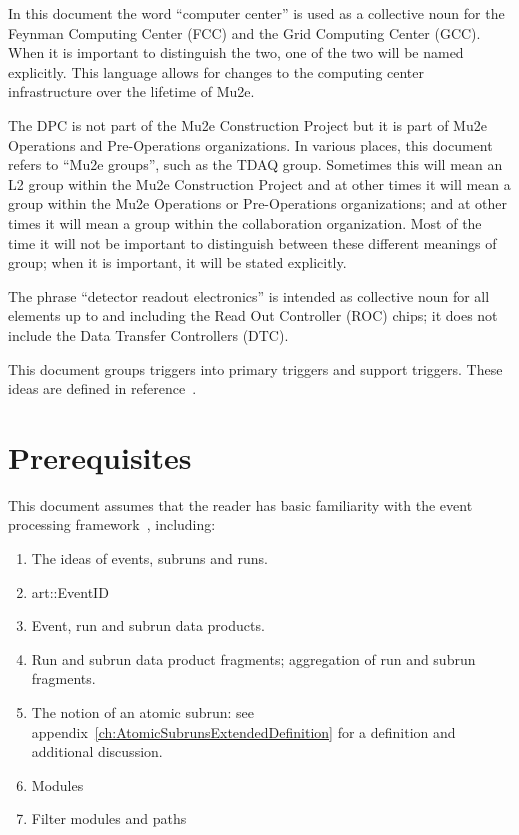 In this document the word ``computer center'' is used as a collective noun for the
Feynman Computing Center (FCC) and the Grid Computing Center (GCC).
When it is important to distinguish the two, one of the two will be named explicitly.
This language allows for changes to the computing center infrastructure over the
lifetime of Mu2e.

The DPC is not part of the Mu2e Construction Project but it is part of Mu2e Operations
and Pre-Operations organizations.
In various places, this document refers to ``Mu2e groups'', such as the TDAQ group.
Sometimes this will mean an L2 group within the Mu2e Construction Project and at other
times it will mean a group within the Mu2e Operations or Pre-Operations organizations;
and at other times it will mean a group within the collaboration organization.
Most of the time it will not be important to distinguish between these different meanings
of group; when it is important, it will be stated explicitly.

The phrase ``detector readout electronics'' is intended as collective noun for all elements
up to and including the Read Out Controller (ROC) chips; it does not include
the Data Transfer Controllers (DTC).

This document groups triggers into primary triggers and support triggers.
These ideas are defined in reference~\cite{TriggerSU2020}.



\section{Prerequisites}
\label{sec:prerequisites}

This document assumes that the reader has basic familiarity with the \art event processing framework~\cite{ARTWORDPRESS}, including:

\begin{enumerate}
\item The ideas of events, subruns and runs.
\item {\code art::EventID}
\item Event, run and subrun  data products.
\item Run and subrun data product fragments; aggregation of run and subrun fragments.
\item The notion of an atomic subrun: see appendix~\ref{ch:AtomicSubrunsExtendedDefinition} for a definition and additional discussion.
\item Modules
\item Filter modules and paths
\end{enumerate}

